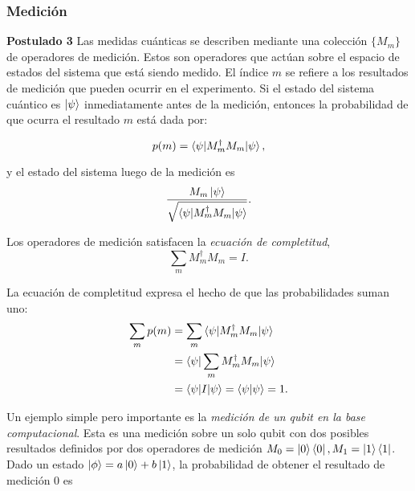 \subsubsection{Medición}

\begin{displayquote}
    \textbf{Postulado 3}
    Las medidas cuánticas se describen mediante una colección $\{M_m\}$ de operadores de medición. Estos son operadores que actúan sobre el espacio de estados del sistema que está siendo medido. El índice $m$ se refiere a los resultados de medición que pueden ocurrir en el experimento. Si el estado del sistema cuántico es $\ket{\psi}$ inmediatamente antes de la medición, entonces la probabilidad de que ocurra el resultado $m$ está dada por:

    \begin{equation}
        p(m) = \braket{\psi|M_m^\dagger M_m|\psi},
    \end{equation}

    y el estado del sistema luego de la medición es
    \begin{equation}
        \frac{M_m\ket{\psi}}{\sqrt{\braket{\psi|M_m^\dagger M_m|\psi}}}.
    \end{equation}

    Los operadores de medición satisfacen la \emph{ecuación de completitud},
    \begin{equation}
        \sum_m M_m^\dagger M_m = I.
    \end{equation}

    La ecuación de completitud expresa el hecho de que las probabilidades suman uno:
    \begin{align*}
\begin{split}
        \sum_m p(m) &= \sum_m  \braket{\psi|M_m^\dagger M_m|\psi}\\
        &= \braket{\psi|\sum_m  M_m^\dagger M_m|\psi}\\
        &= \braket{\psi|I|\psi}=\braket{\psi|\psi} = 1.
\end{split}
    \end{align*}
\end{displayquote}

Un ejemplo simple pero importante es la \emph{medición de un qubit en la base computacional}. Esta es una medición sobre un solo qubit con dos posibles resultados definidos por dos operadores de medición $M_0 = \ket{0}\bra{0}, M_1 = \ket{1}\bra{1}$. Dado un estado $\ket{\phi} = a\ket{0}+b\ket{1}$, la probabilidad de obtener el resultado de medición $0$ es

